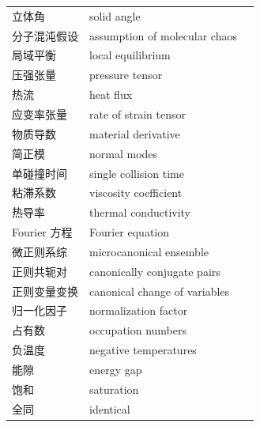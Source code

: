 \begin{xltabular}{\textwidth}{@{}l l c@{}}
  立体角 & {\glossaryfont solid angle} & \pageref{term:3.solid-angle} \\
  分子混沌假设 & {\glossaryfont assumption of molecular chaos} & \pageref{term:3.molecular-chaos} \\
  局域平衡 & {\glossaryfont local equilibrium} & \pageref{term:3.local-equilibrium} \\
  压强张量 & {\glossaryfont pressure tensor} & \pageref{term:3.pressure-tensor} \\
  热流 & {\glossaryfont heat flux} & \pageref{term:3.heat-flux} \\
  应变率张量 & {\glossaryfont rate of strain tensor} & \pageref{term:3.rate-of-strain} \\
  物质导数 & {\glossaryfont material derivative} & \pageref{term:3.material-derivative} \\
  简正模 & {\glossaryfont normal modes} & \pageref{term:3.normal-modes} \\
  单碰撞时间 & {\glossaryfont single collision time} & \pageref{term:3.single-collision-time} \\
  粘滞系数 & {\glossaryfont viscosity coefficient} & \pageref{term:3.viscosity} \\
  热导率 & {\glossaryfont thermal conductivity} & \pageref{term:3.thermal-conductivity} \\
  Fourier 方程 & {\glossaryfont Fourier equation} & \pageref{term:3.fourier-equation} \\
  微正则系综 & {\glossaryfont microcanonical ensemble} & \pageref{term:4.microcanonical} \\
  正则共轭对 & {\glossaryfont canonically conjugate pairs} & \pageref{term:4.canonical-pairs} \\
  正则变量变换 & {\glossaryfont canonical change of variables} & \pageref{term:4.canonical-change} \\
  归一化因子 & {\glossaryfont normalization factor} & \pageref{term:4.normalization-factor} \\
  占有数 & {\glossaryfont occupation numbers} & \pageref{term:4.occupation-numbers} \\
  负温度 & {\glossaryfont negative temperatures} & \pageref{term:4.negative-temperatures} \\
  能隙 & {\glossaryfont energy gap} & \pageref{term:4.energy-gap} \\
  饱和 & {\glossaryfont saturation} & \pageref{term:4.saturation} \\
  全同 & {\glossaryfont identical} & \pageref{term:4.identical} \\

\end{xltabular}
